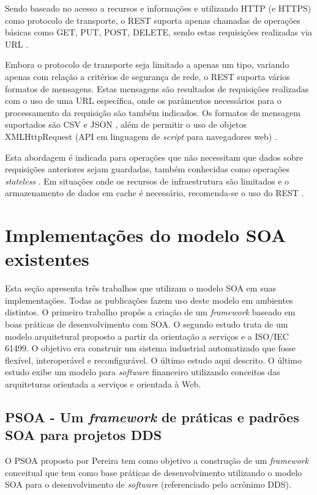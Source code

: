 Sendo baseado no acesso a recursos e informações e utilizando HTTP (e HTTPS) como protocolo de transporte, o REST suporta apenas chamadas de operações básicas como GET, PUT, POST, DELETE, sendo estas requisições realizadas via URL \cite{rozlog_restesoap_2013}.

Embora o protocolo de transporte seja limitado a apenas um tipo, variando apenas com relação a critérios de segurança de rede, o REST suporta vários formatos de mensagens. Estas mensagens são resultados de requisições realizadas com o uso de uma URL específica, onde os parâmentos necessários para o processamento da requisição são também indicados. Os formatos de mensagem suportados são CSV e JSON \cite{mueller_understanding_2013}, além de permitir o uso de objetos XMLHttpRequest (API em linguagem de \textit{script} para navegadores web) \cite{rozlog_restesoap_2013}.

Esta abordagem é indicada para operações que não necessitam que dados sobre requisições anteriores sejam guardadas, também conhecidas como operações \textit{stateless} \cite{rozlog_restesoap_2013}. Em situações onde os recursos de infraestrutura são limitados e o armazenamento de dados em cache é necessário, recomenda-se o uso do REST \cite{rozlog_restesoap_2013}.

\section{Implementações do modelo SOA existentes}

Esta seção apresenta três trabalhos que utilizam o modelo SOA em suas implementações. Todas as publicações fazem uso deste modelo em ambientes distintos. O primeiro trabalho propôs a criação de um \textit{framework} baseado em boas práticas de desenvolvimento com SOA. O segundo estudo trata de um modelo arquitetural proposto a partir da orientação a serviços e a ISO/IEC 61499. O objetivo era construir um sistema industrial automatizado que fosse flexível, interoperável e reconfigurável. O último estudo aqui descrito. O último estudo exibe um modelo para \textit{software} financeiro utilizando conceitos das arquiteturas orientada a serviços e orientada à Web.

\subsection{PSOA - Um \textit{framework} de práticas e padrões SOA para projetos DDS}

O PSOA proposto por Pereira \cite{pereira_psoa_2011} tem como objetivo a construção de um \textit{framework} conceitual que tem como base práticas de desenvolvimento utilizando o modelo SOA para o desenvolvimento de \textit{software} (referenciado pelo acrônimo DDS). 

